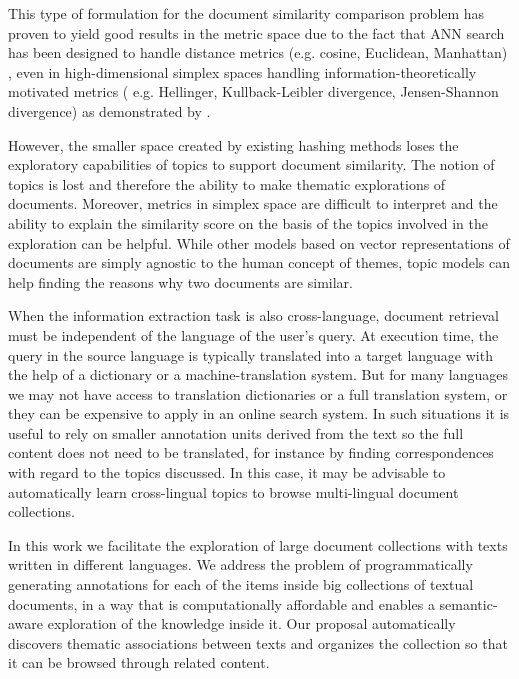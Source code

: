 This type of formulation for the document similarity comparison problem has proven to yield good results in the metric space due to the fact that ANN search has been designed to handle distance metrics (e.g. cosine, Euclidean, Manhattan) \cite{Ravichandran2005}\cite{Petrovic2010}\cite{Krstovski2011}, even in high-dimensional simplex spaces handling information-theoretically motivated metrics ( e.g. Hellinger, Kullback-Leibler divergence, Jensen-Shannon divergence) as demonstrated by \cite{Mao2017}. 

However, the smaller space created by existing hashing methods loses the exploratory capabilities of topics to support document similarity. The notion of topics is lost and therefore the ability to make thematic explorations of documents. Moreover, metrics in simplex space are difficult to interpret and the ability to explain the similarity score on the basis of the topics involved in the exploration can be helpful. While other models based on vector representations of documents are simply agnostic to the human concept of themes, topic models can help finding the reasons why two documents are similar. 



When the information extraction task is also cross-language, document retrieval must be independent of the language of the user's query. At execution time, the query in the source language is typically translated into a target language with the help of a dictionary or a machine-translation system. But for many languages we may not have access to translation dictionaries or a full translation system, or they can be expensive to apply in an online search system. In such situations it is useful to rely on smaller annotation units derived from the text so the full content does not need to be translated, for instance by finding correspondences with regard to the topics discussed. In this case, it may be advisable to automatically learn cross-lingual topics to browse multi-lingual document collections.



In this work we facilitate the exploration of large document collections with texts written in different languages. We address the problem of programmatically generating annotations for each of the items inside big collections of textual documents, in a way that is computationally affordable and enables a semantic-aware exploration of the knowledge inside it. Our proposal automatically discovers thematic associations between texts and organizes the collection so that it can be browsed through related content.


